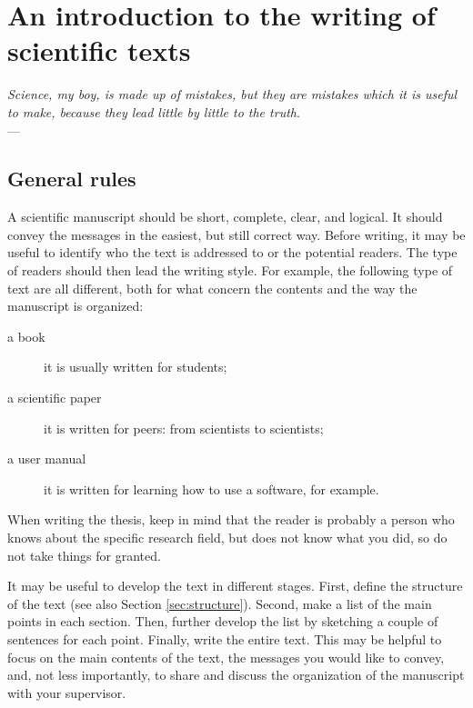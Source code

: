 \chapter{An introduction to the writing of scientific texts} \label{chap:aChapter}
\begin{flushright}{\slshape    
   Science, my boy, is made up of mistakes, but they are mistakes
   which it is useful to make, because they lead little by little
   to the truth}. \\ \medskip --- \citeauthor{verne_journey:1957}
\end{flushright} 

\section{General rules}\label{sec:general_rules}
A scientific manuscript should be short, complete, clear, and logical.
It should convey the messages in the easiest, but still correct way.
Before writing, it may be useful to identify who the text is addressed to or the potential readers.
The type of readers should then lead the writing style. 
For example, the following type of text are all different, both for what concern the contents and the way the manuscript is organized:
\begin{description}
\item[a book] it is usually written for students;
\item[a scientific paper] it is written for peers: from scientists to scientists;
\item[a user manual] it is written for learning how to use a software, for example.
\end{description}

When writing the thesis, keep in mind that the reader is probably a person who knows about the specific research field, but does not know what you did, so do not take things for granted.

It may be useful to develop the text in different stages. 
First, define the structure of the text (see also Section \ref{sec:structure}).
Second, make a list of the main points in each section.
Then, further develop the list by sketching a couple of sentences for each point.
Finally, write the entire text.
This may be helpful to focus on the main contents of the text, the messages you would like to convey, and, not less importantly, to share and discuss the organization of the manuscript with your supervisor.

